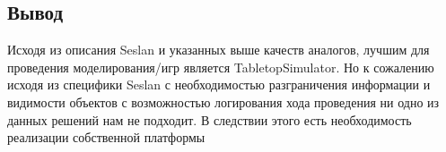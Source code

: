 \subsection{Вывод}

	Исходя из описания Seslan и указанных выше качеств аналогов, лучшим для проведения моделирования/игр является TabletopSimulator. Но к сожалению исходя из специфики Seslan с необходимостью разграничения информации и видимости объектов с возможностью логирования хода проведения ни одно из данных решений нам не подходит. 
	В следствии этого есть необходимость реализации собственной платформы
